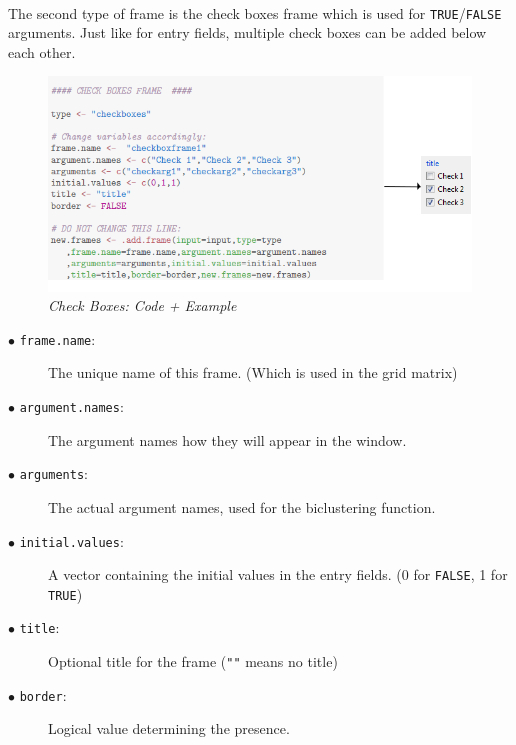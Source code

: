 \documentclass[a4paper]{article}\usepackage[]{graphicx}\usepackage[]{color}
\begin{document}
\\
The second type of frame is the check boxes frame which is used for
\verb|TRUE|/\verb|FALSE| arguments. Just like for entry fields, multiple check
boxes can be added below each other. 
\begin{figure}[H]
\centering
\includegraphics[scale=0.5]{figures/checkboxes.png}
\caption{{\it Check Boxes: Code + Example}
\label{checkboxes}}
\end{figure}

\begin{description}
  \item[$\bullet$ \texttt{frame.name}:] The unique name of this frame. (Which is used in the grid matrix)
  \item[$\bullet$ \texttt{argument.names}:] The argument names how they will
  appear in the window.
  \item[$\bullet$ \texttt{arguments}:] The actual argument names, used for the
  biclustering function.
  \item[$\bullet$ \texttt{initial.values}:] A vector containing the initial
  values in the entry fields. (0 for \verb|FALSE|, 1 for \verb|TRUE|)
  \item[$\bullet$ \texttt{title}:] Optional title for the frame (\verb|""| means no title)
  \item[$\bullet$ \texttt{border}:] Logical value determining the presence. 
\end{description}
\end{document}
